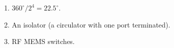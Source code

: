 \begin{enumerate}[leftmargin=1.6em,itemsep=2pt]
\item $360^\circ/2^{4} = 22.5^\circ$.
\item An isolator (a circulator with one port terminated).
\item RF MEMS switches.
\end{enumerate}
